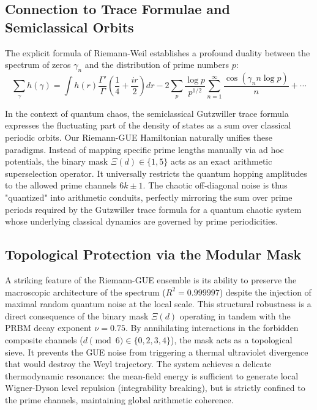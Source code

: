 \documentclass[prl,aps,floatfix,superscriptaddress,10pt]{revtex4-2}
\begin{document}
\subsection{Connection to Trace Formulae and Semiclassical Orbits}

The explicit formula of Riemann-Weil establishes a profound duality between the spectrum of zeros $\gamma_n$ and the distribution of prime numbers $p$:
\begin{equation}
\sum_{\gamma} h(\gamma) = \int h(r) \frac{\Gamma'}{\Gamma}\left(\frac14 + \frac{ir}{2}\right) dr - 2\sum_{p} \frac{\log p}{p^{1/2}} \sum_{n=1}^\infty \frac{\cos(\gamma_n n\log p)}{n} + \cdots
\end{equation}

In the context of quantum chaos, the semiclassical Gutzwiller trace formula expresses the fluctuating part of the density of states as a sum over classical periodic orbits. Our Riemann-GUE Hamiltonian naturally unifies these paradigms. Instead of mapping specific prime lengths manually via ad hoc potentials, the binary mask $\Xi(d) \in \{1,5\}$ acts as an exact arithmetic superselection operator. It universally restricts the quantum hopping amplitudes to the allowed prime channels $6k\pm1$. The chaotic off-diagonal noise is thus "quantized" into arithmetic conduits, perfectly mirroring the sum over prime periods required by the Gutzwiller trace formula for a quantum chaotic system whose underlying classical dynamics are governed by prime periodicities.

\subsection{Topological Protection via the Modular Mask}

A striking feature of the Riemann-GUE ensemble is its ability to preserve the macroscopic architecture of the spectrum ($R^2 = 0.999997$) despite the injection of maximal random quantum noise at the local scale.
This structural robustness is a direct consequence of the binary mask $\Xi(d)$ operating in tandem with the PRBM decay exponent $\nu = 0.75$.
By annihilating interactions in the forbidden composite channels ($d \pmod 6 \in \{0, 2, 3, 4\}$), the mask acts as a topological sieve. It prevents the GUE noise from triggering a thermal ultraviolet divergence that would destroy the Weyl trajectory. The system achieves a delicate thermodynamic resonance: the mean-field energy is sufficient to generate local Wigner-Dyson level repulsion (integrability breaking), but is strictly confined to the prime channels, maintaining global arithmetic coherence.
\end{document}
